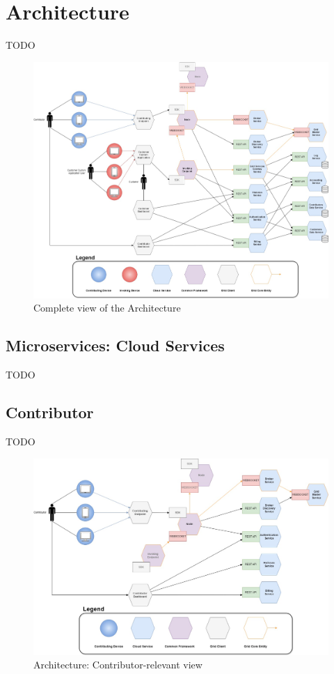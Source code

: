 \section{Architecture}
TODO
\begin{figure}[!ht]
    \centering
    \includegraphics[width=\linewidth]{document/chapters/chapter_6/images/architecture_complete.jpg}
    \caption{Complete view of the Architecture}
    \label{fig:architecture_complete}
\end{figure}

\subsection{Microservices: Cloud Services}
TODO

\subsection{Contributor}
TODO

\begin{figure}[!ht]
    \centering
    \includegraphics[width=\linewidth]{document/chapters/chapter_6/images/architecture_contributor.jpg}
    \caption{Architecture: Contributor-relevant view}
    \label{fig:architecture_contributor}
\end{figure}

